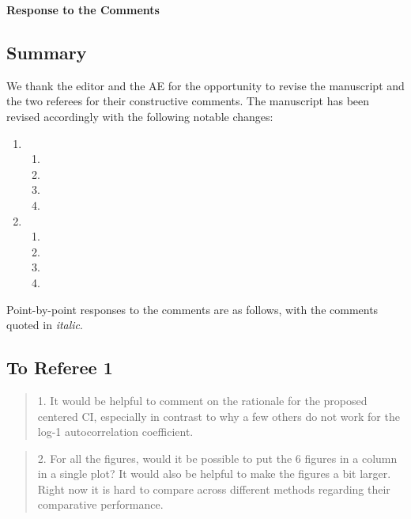 \documentclass[12pt]{article}
\newcommand{\jy}[1]{\textcolor{red}{JY: #1}}
\newenvironment{comment}%
{\begin{quotation}\noindent\small\it\color{darkblue}\ignorespaces%
}{\end{quotation}}
\begin{document}
\begin{center}
  {\Large\bf Response to the Comments}
\end{center}



\subsection*{Summary}

We thank the editor and the AE for the opportunity to revise the manuscript and
the two referees for their constructive comments. The manuscript has been
revised accordingly with the following notable changes:
\begin{enumerate}
\item 
  \begin{enumerate}
    \item 
    \item 
    \item 
    \item 
    \end{enumerate}
\item 
  \begin{enumerate}
  \item 
  \item 
  \item 
  \item 
  \end{enumerate}
\end{enumerate}



Point-by-point responses to the comments are as follows, with the
comments quoted in \emph{\color{darkblue} italic}.

\subsection*{To Referee 1}

\begin{comment}
1. It would be helpful to comment on the rationale for the proposed centered CI, 
especially in contrast to why a few others do not work for the log-1 
autocorrelation coefficient.
\end{comment}



\begin{comment}
2. For all the figures, would it be possible to put the 6 figures in a column in 
a single plot? It would also be helpful to make the figures a bit larger. Right 
now it is hard to compare across different methods regarding their comparative 
performance.
\end{comment}
\end{document}

